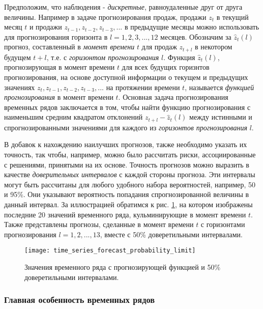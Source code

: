 Предположим, что наблюдения - \textit{дискретные}, равноудаленные друг от друга величины. 
Например в задаче прогнозирования продаж, продажи $z_t$ в текущий месяц $t$ и продажи 
$z_{t-1}, z_{t-2}, z_{t-3}, ...$ в предыдущие месяцы можно использовать для 
прогнозирования горизонта в $l = 1, 2, 3, ..., 12$ месяцев. Обозначим за $\hat{z}_t (l)$ 
прогноз, составленный в \textit{момент времени} $t$ для продаж $z_{t+l}$ в некотором будущем $t+l$, т.е.
с \textit{горизонтом прогнозирования} $l$. Функция $\hat{z}_t (l)$, прогнозирующая в момент времени 
$t$ для всех будущих горизнтов прогнозирования, на основе доступной информации о 
текущем и предыдущих значениях $z_t, z_{t-1}, z_{t-2}, z_{t-3}, ...$ на протяжении времени $t$, 
называется \textit{функцией прогнозирования} в момент времени $t$. Основная задача 
прогнозирования временных рядов заключается в том, чтобы найти функцию прогнозирования с 
наименьшим средним квадратом отклонений $z_{t+l} - \hat{z}_t (l)$ между истинными и 
спрогнозированными значениями для каждого из \textit{горизонтов прогнозирования} $l$. 

В добавок к нахождению наилучших прогнозов, также необходимо указать их точность, так 
чтобы, например, можно было рассчитать риски, ассоциированные с решениями, принятыми на 
их основе. Точность прогнозов можно выразить в качестве \textit{доверительных интервалов} 
с каждой стороны прогноза. Эти интервалы могут быть рассчитаны для любого удобного набора 
вероятностей, например, 50 и 95\%. Они указывают вероятность попадания спрогнозированной 
величины в данный интервал. За иллюстрацией обратимся к рис. \ref{fig:time_series_forecast_probability_limit}, 
на котором изображены последние 20 значений временного ряда, кульминирующие в момент времени $t$. 
Также представлены прогнозы, сделанные в момент времени $t$ с горизонтами прогнозирования 
$l = 1, 2, ..., 13$, вместе с 50\% доверетильными интервалами.

\begin{figure}[h!]
    \centering
    \texttt{[image: time\_series\_forecast\_probability\_limit]}
    \caption{Значения временного ряда с прогнозирующей функцией и 50\% доверетильными интервалами.}
    \label{fig:time_series_forecast_probability_limit}
\end{figure}

\subsubsection{Главная особенность временных рядов}

